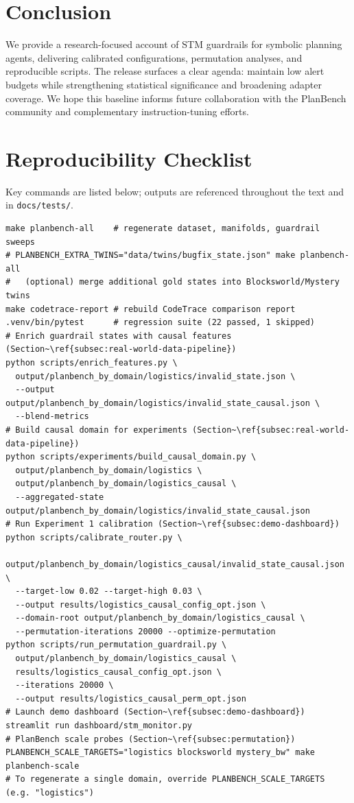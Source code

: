 \documentclass[11pt]{article}
\begin{document}
\section{Conclusion}
We provide a research-focused account of STM guardrails for symbolic planning
agents, delivering calibrated configurations, permutation analyses, and
reproducible scripts. The release surfaces a clear agenda: maintain low alert
budgets while strengthening statistical significance and broadening adapter
coverage. We hope this baseline informs future collaboration with the PlanBench
community and complementary instruction-tuning efforts.

\appendix

\section{Reproducibility Checklist}
Key commands are listed below; outputs are referenced throughout the text and in
\texttt{docs/tests/}.

\begin{lstlisting}[style=stm]
make planbench-all    # regenerate dataset, manifolds, guardrail sweeps
# PLANBENCH_EXTRA_TWINS="data/twins/bugfix_state.json" make planbench-all
#   (optional) merge additional gold states into Blocksworld/Mystery twins
make codetrace-report # rebuild CodeTrace comparison report
.venv/bin/pytest      # regression suite (22 passed, 1 skipped)
# Enrich guardrail states with causal features (Section~\ref{subsec:real-world-data-pipeline})
python scripts/enrich_features.py \
  output/planbench_by_domain/logistics/invalid_state.json \
  --output output/planbench_by_domain/logistics/invalid_state_causal.json \
  --blend-metrics
# Build causal domain for experiments (Section~\ref{subsec:real-world-data-pipeline})
python scripts/experiments/build_causal_domain.py \
  output/planbench_by_domain/logistics \
  output/planbench_by_domain/logistics_causal \
  --aggregated-state output/planbench_by_domain/logistics/invalid_state_causal.json
# Run Experiment 1 calibration (Section~\ref{subsec:demo-dashboard})
python scripts/calibrate_router.py \
  output/planbench_by_domain/logistics_causal/invalid_state_causal.json \
  --target-low 0.02 --target-high 0.03 \
  --output results/logistics_causal_config_opt.json \
  --domain-root output/planbench_by_domain/logistics_causal \
  --permutation-iterations 20000 --optimize-permutation
python scripts/run_permutation_guardrail.py \
  output/planbench_by_domain/logistics_causal \
  results/logistics_causal_config_opt.json \
  --iterations 20000 \
  --output results/logistics_causal_perm_opt.json
# Launch demo dashboard (Section~\ref{subsec:demo-dashboard})
streamlit run dashboard/stm_monitor.py
# PlanBench scale probes (Section~\ref{subsec:permutation})
PLANBENCH_SCALE_TARGETS="logistics blocksworld mystery_bw" make planbench-scale
# To regenerate a single domain, override PLANBENCH_SCALE_TARGETS (e.g. "logistics")
\end{lstlisting}
\end{document}
